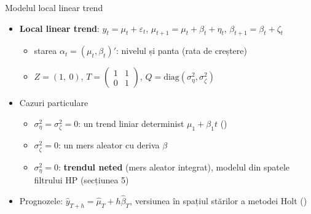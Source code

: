 \begin{frame}{Modelul local linear trend}
\itemsize{\small}
\begin{itemize}
    \item \textbf{Local linear trend}: $y_t = \mu_t + \varepsilon_t$, \quad $\mu_{t+1} = \mu_t + \beta_t + \eta_t$, \quad $\beta_{t+1} = \beta_t + \zeta_t$
    \begin{itemize}
        \item starea $\alpha_t = (\mu_t, \beta_t)'$: nivelul și panta (rata de creștere)
        \item $Z = (1,\ 0)$, \quad $T = \begin{pmatrix}1 & 1\\ 0 & 1\end{pmatrix}$, \quad $Q = \mathrm{diag}(\sigma^2_\eta, \sigma^2_\zeta)$
    \end{itemize}
    \item Cazuri particulare
    \begin{itemize}
        \item $\sigma^2_\eta = \sigma^2_\zeta = 0$: un trend liniar determinist $\mu_1 + \beta_1 t$ ()
        \item $\sigma^2_\zeta = 0$: un mers aleator cu deriva $\beta$
        \item $\sigma^2_\eta = 0$: \textbf{trendul neted} (mers aleator integrat), modelul din spatele filtrului HP (secțiunea 5)
    \end{itemize}
    \item Prognozele: $\hat y_{T+h} = \hat\mu_T + h\hat\beta_T$, versiunea în spațiul stărilor a metodei Holt ()
\end{itemize}
\end{frame}

